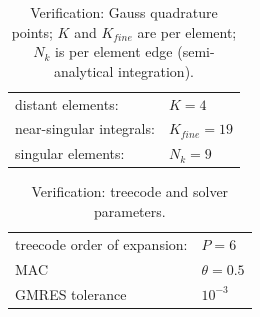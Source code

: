 \begin{table}%
    \centering
    \caption{\label{table:quadparams2} Verification: Gauss quadrature points; 
    $K$ and $K_{fine}$ are per element; $N_k $ is per element edge (semi-analytical integration). } 
    \begin{tabular}{l l}
    \hline%
     distant elements: & $K=4$ \\
     near-singular integrals:   & $ K_{fine}=19$ \\
     singular elements:  & $N_k =9$ \\
    \hline%
    \end{tabular}
\end{table}


\begin{table}%
    \centering
    \caption{\label{table:treeparams2} Verification: treecode and solver parameters.} 
    \begin{tabular}{l l}
    \hline%
    treecode order of expansion: & $P=6$\\
    MAC                                         & $\theta=0.5$\\
    GMRES tolerance                    & $10^{-3}$\\
    \hline%
    \end{tabular}
\end{table}
